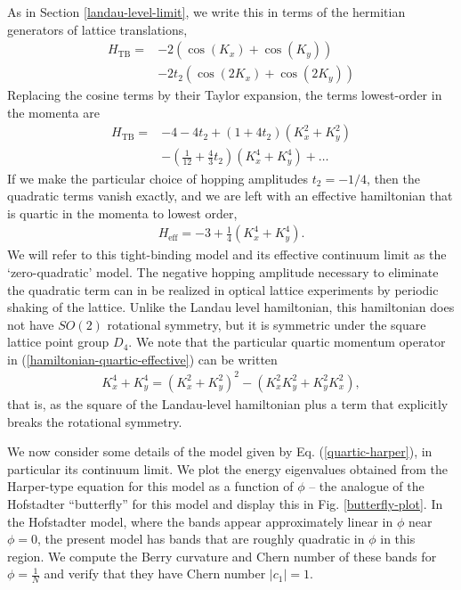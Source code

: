 \documentclass[aps,prb,twocolumn,letterpaper,twoside,nobalancelastpage,groupedaddress,amsmath,amssymb,floatfix,citeautoscript]{revtex4-1}
\begin{document}
As in Section \ref{landau-level-limit}, we write this in terms of the hermitian generators of lattice translations,
\begin{align*}
H_{\text{TB}} = &-2\left(\cos(K_x) + \cos(K_y)\right)\\ &- 2t_2\left(\cos(2K_x) + \cos(2K_y)\right)
\end{align*}
Replacing the cosine terms by their Taylor expansion, the terms lowest-order in the momenta are 
\begin{align*}
H_{\text{TB}} = &-4 - 4 t_2 + (1 + 4t_2) \left(K_x^2 + K_y^2\right) \\
&- \left(\frac{1}{12} + \frac{4}{3}t_2\right) \left(K_x^4 + K_y^4\right) + \ldots
\end{align*}
If we make the particular choice of hopping amplitudes $t_2 = -1/4$, then the quadratic terms vanish exactly, and we are left with an effective hamiltonian that is quartic in the momenta to lowest order,
\begin{align}
\label{hamiltonian-quartic-effective}
H_{\text{eff}} = -3 + \frac{1}{4} \left(K_x^4 + K_y^4\right).
\end{align}
We will refer to this tight-binding model and its effective continuum limit as the `zero-quadratic' model. The negative hopping amplitude necessary to eliminate the quadratic term can in be realized in optical lattice experiments by periodic shaking of the lattice\cite{eckardt_colloquium_2017}. Unlike the Landau level hamiltonian, this hamiltonian does not have $SO(2)$ rotational symmetry, but it is symmetric under the square lattice point group $D_4$. We note that the particular quartic momentum operator in (\ref{hamiltonian-quartic-effective}) can be written
\begin{align*}
K_x^4 + K_y^4 = \left(K_x^2 + K_y^2\right)^2 - \left(K_x^2K_y^2 + K_y^2K_x^2\right),
\end{align*}
that is, as the square of the Landau-level hamiltonian plus a term that explicitly breaks the rotational symmetry.

We now consider some details of the model given by Eq. (\ref{quartic-harper}), in particular its continuum limit. We plot the energy eigenvalues obtained from the Harper-type equation for this model as a function of $\phi$ -- the analogue of the Hofstadter ``butterfly'' for this model\cite{hofstadter_energy_1976} and display this in Fig. \ref{butterfly-plot}. In the Hofstadter model, where the bands appear approximately linear in $\phi$ near $\phi = 0$, the present model has bands that are roughly quadratic in $\phi$ in this region. We compute the Berry curvature and Chern number of these bands for $\phi = \frac{1}{N}$ and verify that they have Chern number $|c_1| = 1$.
\end{document}
